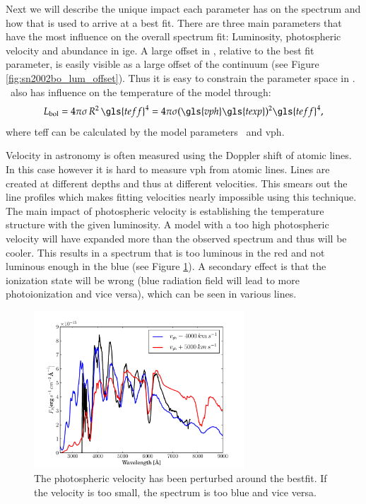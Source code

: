 Next we will describe the unique impact each parameter has on the spectrum and how that is used to arrive at a best fit. There are three main parameters that have the most influence on the overall spectrum fit: Luminosity, photospheric velocity and abundance in \gls{ige}.
A large offset in \lum, relative to the best fit parameter, is easily visible as a large offset of the continuum (see Figure \ref{fig:sn2002bo_lum_offset}). Thus it is easy to constrain the parameter space in \lum. \lum\ also has influence on the temperature of the model through:
\[
L_{\rm bol} = 4\pi\sigma\, R^2\,\gls{teff}^4 = 4\pi\sigma(\gls{vph}\gls{texp})^2 \gls{teff}^4,
\label{eq:lum_temp_relation}
\]
where \gls{teff} can be calculated by the model parameters \lum\ and \gls{vph}. 

Velocity in astronomy is often measured using the Doppler shift of atomic lines. In this case however it is hard to measure \gls{vph} from atomic lines.  Lines are created at different depths and thus at different velocities. This smears out the line profiles which makes fitting velocities nearly impossible using this technique. The main impact of photospheric velocity is establishing the temperature structure with the given luminosity. A model with a too high photospheric velocity will have expanded more than the observed spectrum and thus will be cooler. This results in a spectrum that is too luminous in the red and not luminous enough in the blue (see Figure \ref{fig:sn2002bo_vph_offset}). A secondary effect is that the ionization state will be wrong (blue radiation field will lead to more photoionization and vice versa), which can be seen in various lines. 


\begin{figure}[tb] %
   \centering
   \includegraphics[width=0.7\textwidth]{chapter_dalek/plots/bf2002bo-10_vph.pdf} 
   \caption{The photospheric velocity has been perturbed around the bestfit. If the velocity is too small, the spectrum is too blue and vice versa.}
   \label{fig:sn2002bo_vph_offset}
\end{figure}



